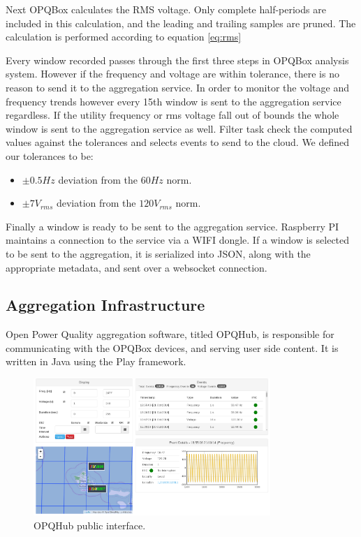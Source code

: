 Next OPQBox calculates the RMS voltage. Only complete half-periods are included in this calculation, and the leading and trailing samples are pruned. The calculation is performed according to equation
\ref{eq:rms}

Every window recorded passes through the first three steps in OPQBox analysis system. However if the frequency and voltage are within tolerance, there is no reason to send it to the aggregation service.
In order to monitor the voltage and frequency trends however every 15th window is sent to the aggregation service regardless. If the utility frequency or rms voltage fall out of bounds the whole window is 
sent to the aggregation service as well. Filter task check the computed values against the tolerances and selects events to send to the cloud. We defined our tolerances to be:
\begin{itemize}
\item $\pm 0.5Hz$ deviation from the $60Hz$ norm.
\item $\pm 7V_{rms}$ deviation from the $120V_{rms}$ norm.
\end{itemize}

Finally a window is ready to be sent to the aggregation service. Raspberry PI maintains a connection to the service via a WIFI dongle. If a window is selected to be sent to the aggregation, it is
serialized into JSON, along with the appropriate metadata, and sent over a websocket connection.

\subsection{Aggregation Infrastructure}
Open Power Quality aggregation software, titled OPQHub, is responsible for communicating with the OPQBox devices, and serving user side content. It is written in Java using the Play framework. 
\begin{figure}[h!]
\label{fig:opqhub}
\centering
\includegraphics[width=0.8\textwidth]{img/opqhub.png}
\caption{OPQHub public interface.}
\end{figure}

